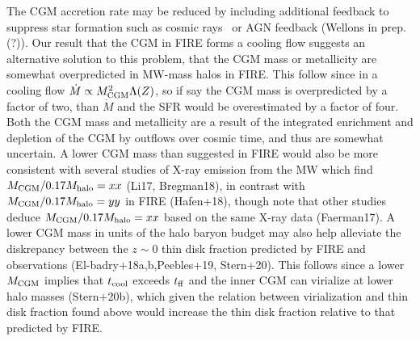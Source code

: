 \documentclass[fleqn,usenatbib]{mnras}
\newcommand{\Mdot}{\dot{M}}
\begin{document}
The CGM accretion rate may be reduced by including additional feedback to suppress star formation such as cosmic rays~\citep{Chan2019, Hopkins2020, Hopkins2020a, Hopkins2020b}
or AGN feedback (Wellons in prep.(?)). 
Our result that the CGM in FIRE forms a cooling flow suggests an alternative solution to this problem, that the CGM mass or metallicity are somewhat overpredicted in MW-mass halos in FIRE.
This follow since in a cooling flow $\Mdot\propto M_{\rm CGM}^2 \Lambda(Z)$, so if say the CGM mass is overpredicted by a factor of two, than $\Mdot$ and the SFR would be overestimated by a factor of four.
Both the CGM mass and metallicity are a result of the integrated enrichment and depletion of the CGM by outflows over cosmic time, and thus are somewhat uncertain. %
A lower CGM mass than suggested in FIRE would also be more consistent with several studies of X-ray emission from the MW which find $M_{\rm CGM}/0.17M_{\rm halo}=xx$ (Li17, Bregman18), in contrast with $M_{\rm CGM}/0.17M_{\rm halo}=yy$ in FIRE (Hafen+18), though note that other studies deduce $M_{\rm CGM}/0.17M_{\rm halo}=xx$ based on the same X-ray data (Faerman17).
A lower CGM mass in units of the halo baryon budget may also help alleviate the diskrepancy between the $z\sim0$ thin disk fraction predicted by FIRE and observations (El-badry+18a,b,Peebles+19, Stern+20).
This follows since a lower $M_{\rm CGM}$ implies that $t_{\rm cool}$ exceeds $t_{\rm ff}$ and the inner CGM can virialize at lower halo masses (Stern+20b), which given the relation between virialization and thin disk fraction found above would increase the thin disk fraction relative to that predicted by FIRE. 

\end{document}
